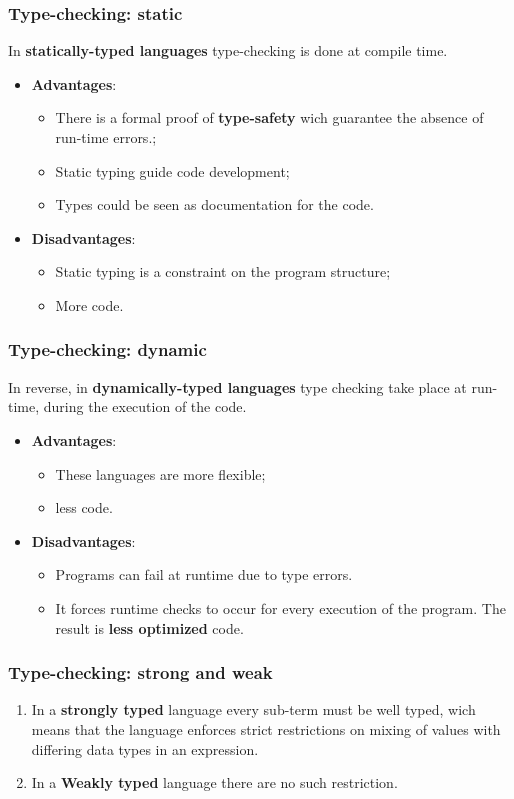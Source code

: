 \documentclass[xcolor ={table,usenames,dvipsnames}]{beamer}
\theoremstyle{definition}
\begin{document}
	\begin{frame}
		\frametitle{Type-checking: static  }
		In \textbf{statically-typed languages} type-checking is done at compile time.
		\begin{itemize}
			\item \textbf{Advantages}:\begin{itemize}
				\item There is a formal proof of \textbf{type-safety} wich guarantee the absence of run-time errors.;
				\item Static typing guide code development;
				\item Types could be seen as documentation for the code.
			\end{itemize}
			\item \textbf{Disadvantages}: 
			\begin{itemize}
				\item Static typing is a constraint on the program structure;
				\item More code.
			\end{itemize}
		\end{itemize}
	\end{frame}

\begin{frame}
	\frametitle{Type-checking: dynamic}
	In reverse, in \textbf{dynamically-typed languages}
	type checking take place at run-time, during the execution of the code.
	\begin{itemize}
		\item \textbf{Advantages}:
		\begin{itemize}
			\item These languages are more flexible;
			\item less code.
		\end{itemize}
		\item \textbf{Disadvantages}:
		\begin{itemize}
			\item Programs can fail at runtime due to type errors.
			\item It forces runtime checks to occur for every execution of the program. The result is \textbf{less optimized} code.
		\end{itemize}
	\end{itemize}
 \end{frame}

\begin{frame}
	\frametitle{Type-checking: strong and weak}
	\begin{enumerate}
		\item In a \textbf{strongly typed} language every sub-term must be well typed, wich means that the language  enforces strict restrictions on mixing of values with differing data types in an expression.
		\item In a \textbf{Weakly typed} language there are no such restriction.
	\end{enumerate}
	
\end{frame}
\end{document}
